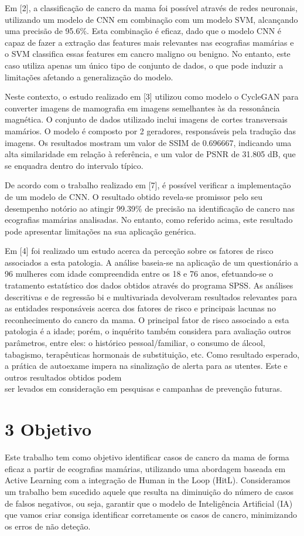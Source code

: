 \documentclass[10pt]{article}
\begin{document}
Em [2], a classificação de cancro da mama foi possível através de redes neuronais, utilizando um modelo de CNN em combinação com um modelo SVM, alcançando uma precisão de 95.6\%. Esta combinação é eficaz, dado que o modelo CNN é capaz de fazer a extração das features mais relevantes nas ecografias mamárias e o SVM classifica essas features em cancro maligno ou benigno. No entanto, este caso utiliza apenas um único tipo de conjunto de dados, o que pode induzir a limitações afetando a generalização do modelo.

Neste contexto, o estudo realizado em [3] utilizou como modelo o CycleGAN para converter imagens de mamografia em imagens semelhantes às da ressonância magnética. O conjunto de dados utilizado inclui imagens de cortes transversais mamários. O modelo é composto por 2 geradores, responsáveis pela tradução das imagens. Os resultados mostram um valor de SSIM de 0.696667, indicando uma alta similaridade em relação à referência, e um valor de PSNR de 31.805 dB, que se enquadra dentro do intervalo típico.

De acordo com o trabalho realizado em [7], é possível verificar a implementação de um modelo de CNN. O resultado obtido revela-se promissor pelo seu desempenho notório ao atingir 99.39\% de precisão na identificação de cancro nas ecografias mamárias analisadas. No entanto, como referido acima, este resultado pode apresentar limitações na sua aplicação genérica.

Em [4] foi realizado um estudo acerca da perceção sobre os fatores de risco associados a esta patologia. A análise baseia-se na aplicação de um questionário a 96 mulheres com idade compreendida entre os 18 e 76 anos, efetuando-se o tratamento estatístico dos dados obtidos através do programa SPSS. As análises descritivas e de regressão bi e multivariada devolveram resultados relevantes para as entidades responsáveis acerca dos fatores de risco e principais lacunas no reconhecimento do cancro da mama. O principal fator de risco associado a esta patologia é a idade; porém, o inquérito também considera para avaliação outros parâmetros, entre eles: o histórico pessoal/familiar, o consumo de álcool, tabagismo, terapêuticas hormonais de substituição, etc. Como resultado esperado, a prática de autoexame impera na sinalização de alerta para as utentes. Este e outros resultados obtidos podem\\
ser levados em consideração em pesquisas e campanhas de prevenção futuras.

\section*{3 Objetivo}
Este trabalho tem como objetivo identificar casos de cancro da mama de forma eficaz a partir de ecografias mamárias, utilizando uma abordagem baseada em Active Learning com a integração de Human in the Loop (HitL). Consideramos um trabalho bem sucedido aquele que resulta na diminuição do número de casos de falsos negativos, ou seja, garantir que o modelo de Inteligência Artificial (IA) que vamos criar consiga identificar corretamente os casos de cancro, minimizando os erros de não deteção.
\end{document}

